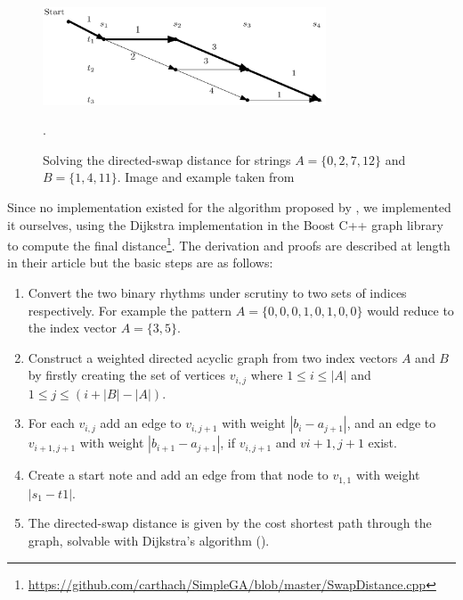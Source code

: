 \begin{figure}
	\begin{center}
		\includegraphics[width=0.75\textwidth]{ch03_symbolic/figures/shortest_path.png}
	\end{center}
	\caption[Solving the directed-swap distance graph for two strings]{Solving the directed-swap distance for strings $A=\{0,2,7,12\}$ and $B=\{1,4,11\}$. Image and example taken from \cite{Colannino2005}}.
	\label{fig:dijkstra}
\end{figure}

Since no implementation existed for the algorithm proposed by \cite{Colannino2005}, we implemented it ourselves, using the Dijkstra implementation in the Boost C++ graph library \citep{Siek2002} to compute the final distance\footnote{\url{https://github.com/carthach/SimpleGA/blob/master/SwapDistance.cpp}}. The derivation and proofs are described at length in their article \citep{Colannino2005} but the basic steps are as follows:

\begin{enumerate}
  \item Convert the two binary rhythms under scrutiny to two sets of indices respectively. For example the pattern $A = \{0, 0, 0, 1, 0, 1, 0, 0\}$ would reduce to the index vector $A = \{3, 5\}$.
  \item Construct a weighted directed acyclic graph from two index vectors $A$ and $B$ by firstly creating the set of vertices $v_{i,j}$ where $1 \leq i \leq |A|$ and $1 \leq j \leq (i+|B|-|A|)$.
  \item For each $v_{i,j}$ add an edge to $v_{i, j+1}$ with weight $|b_{i}-a_{j+1}|$, and an edge to $v_{i+1, j+1}$ with weight $|b_{i+1}-a_{j+1}|$, if $v_{i, j+1}$ and $v{i+1, j+1}$ exist.
  \item Create a start note and add an edge from that node to $v_{1,1}$ with weight $|s_{1}-t{1}|$.
  \item The directed-swap distance is given by the cost shortest path through the graph, solvable with Dijkstra's algorithm ().
\end{enumerate}

